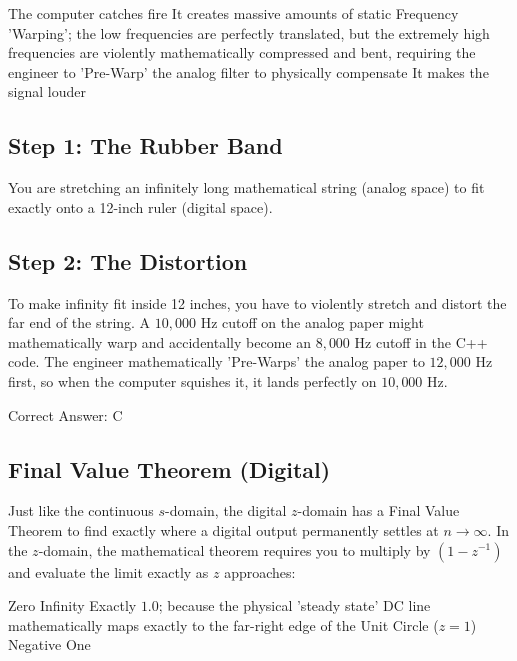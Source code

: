 \begin{choices}
    \choice The computer catches fire
    \choice It creates massive amounts of static
    \correctchoice Frequency 'Warping'; the low frequencies are perfectly translated, but the extremely high frequencies are violently mathematically compressed and bent, requiring the engineer to 'Pre-Warp' the analog filter to physically compensate
    \choice It makes the signal louder
\end{choices}

\begin{solution}

\subsection*{Step 1: The Rubber Band}
You are stretching an infinitely long mathematical string (analog space) to fit exactly onto a 12-inch ruler (digital space).

\subsection*{Step 2: The Distortion}
To make infinity fit inside 12 inches, you have to violently stretch and distort the far end of the string. A $10,000\text{ Hz}$ cutoff on the analog paper might mathematically warp and accidentally become an $8,000\text{ Hz}$ cutoff in the C++ code. The engineer mathematically 'Pre-Warps' the analog paper to $12,000\text{ Hz}$ first, so when the computer squishes it, it lands perfectly on $10,000\text{ Hz}$.

Correct Answer: C
\end{solution}

\clearpage

\subsection{Final Value Theorem (Digital)}

Just like the continuous $s$-domain, the digital $z$-domain has a Final Value Theorem to find exactly where a digital output permanently settles at $n \rightarrow \infty$. In the $z$-domain, the mathematical theorem requires you to multiply by $(1 - z^{-1})$ and evaluate the limit exactly as $z$ approaches:

\begin{choices}
    \choice Zero
    \choice Infinity
    \correctchoice Exactly $1.0$; because the physical 'steady state' DC line mathematically maps exactly to the far-right edge of the Unit Circle ($z=1$)
    \choice Negative One
\end{choices}

